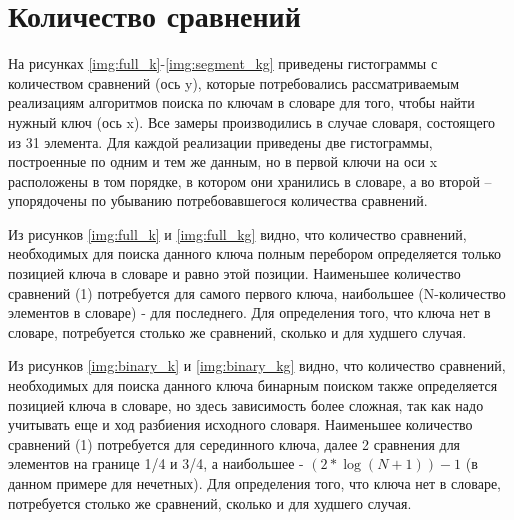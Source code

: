 \section{Количество сравнений}

На рисунках \ref{img:full_k}-\ref{img:segment_kg} приведены гистограммы с количеством сравнений (ось y), которые потребовались рассматриваемым реализациям алгоритмов поиска по ключам в словаре для того, чтобы найти нужный ключ (ось x). Все замеры производились в случае словаря, состоящего из 31 элемента. Для каждой реализации приведены две гистограммы, построенные по одним и тем же данным, но в первой ключи на оси x расположены в том порядке, в котором они хранились в словаре, а во второй -- упорядочены по убыванию потребовавшегося количества сравнений.

\clearpage
{}

\clearpage
{}

\clearpage
{}

\clearpage
Из рисунков \ref{img:full_k} и \ref{img:full_kg} видно, что количество сравнений, необходимых для поиска данного ключа полным перебором определяется только позицией ключа в словаре и равно этой позиции. Наименьшее количество сравнений (1) потребуется для самого первого ключа, наибольшее (N-количество элементов в словаре) - для последнего. Для определения того, что ключа нет в словаре, потребуется столько же сравнений, сколько и для худшего случая.

Из рисунков \ref{img:binary_k} и \ref{img:binary_kg} видно, что количество сравнений, необходимых для поиска данного ключа бинарным поиском также определяется позицией ключа в словаре, но здесь зависимость более сложная, так как надо учитывать еще и ход разбиения исходного словаря. Наименьшее количество сравнений (1) потребуется для серединного ключа, далее 2 сравнения для элементов на границе 1/4 и 3/4, а наибольшее - $(2*\log{(N+1)}) - 1$ (в данном примере для нечетных). Для определения того, что ключа нет в словаре, потребуется столько же сравнений, сколько и для худшего случая.

